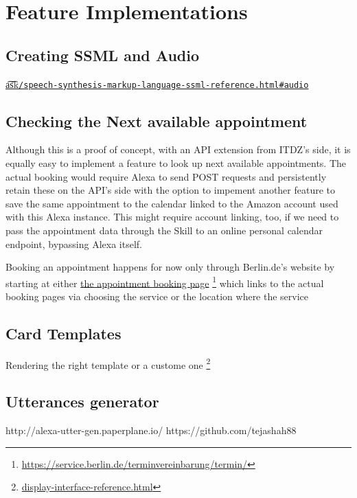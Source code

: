 \section[Features]{Feature Implementations}


\subsection{Creating SSML and Audio}


\href{https://developer.amazon.com/docs/custom-skills/speech-synthesis-markup-language-ssml-reference.html#audio}{\t{a\t{sk}}\lstinline|/speech-synthesis-markup-language-ssml-reference.html#audio|}



\subsection{Checking the Next available appointment}

Although this is a proof of concept, with an API extension from ITDZ's side, it is equally easy to implement a feature to look up next available appointments.
The actual booking would require Alexa to send POST requests and persistently retain these on the API's side with the option to impement another feature to save the same appointment to the calendar linked to the Amazon account used with this Alexa instance. This might require account linking, too, if we need to pass the appointment data through the Skill to an online personal calendar endpoint, bypassing Alexa itself.

Booking an appointment happens for now only through Berlin.de's website by starting at either \href{https://service.berlin.de/terminvereinbarung/termin/}{the appointment booking page} \footnote{\url{https://service.berlin.de/terminvereinbarung/termin/}} which links to the actual booking pages via choosing the service or the location where the service 



\subsection{Card Templates}

Rendering the right template or a custome one \footnote{\href{https://developer.amazon.com/docs/custom-skills/display-interface-reference.html}{display-interface-reference.html}}

\subsection{Utterances generator}
http://alexa-utter-gen.paperplane.io/
https://github.com/tejashah88


